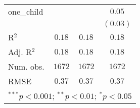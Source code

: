 \begin{table}
\begin{center}
\begin{tabular}{l c c c}
one\_child                    &               &               & $0.05$        \\
                              &               &               & $(0.03)$      \\
\hline
R$^2$                         & $0.18$        & $0.18$        & $0.18$        \\
Adj. R$^2$                    & $0.18$        & $0.18$        & $0.18$        \\
Num. obs.                     & $1672$        & $1672$        & $1672$        \\
RMSE                          & $0.37$        & $0.37$        & $0.37$        \\
\hline
\multicolumn{4}{l}{\scriptsize{$^{***}p<0.001$; $^{**}p<0.01$; $^{*}p<0.05$}}
\end{tabular}
\label{table:coefficients}
\end{center}
\end{table}
